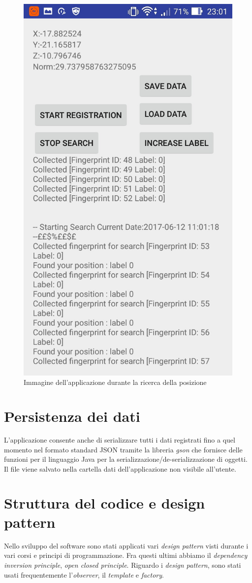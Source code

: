 \begin{figure}[H]
	\centering
	\includegraphics[width=0.7\linewidth]{img/app2}
	\caption{Immagine dell'applicazione durante la ricerca della posizione}
	\label{fig:app2}
\end{figure}


\section{Persistenza dei dati}
L'applicazione consente anche di serializzare tutti i dati registrati fino a quel momento nel formato standard JSON tramite la libreria \textit{gson} che fornisce delle funzioni  per il linguaggio Java per la serializzazione/de-serializzazione di oggetti. Il file viene salvato nella cartella dati dell'applicazione non visibile all'utente.

\section{Struttura del codice e design pattern}
Nello sviluppo del software sono stati applicati vari \textit{design pattern} visti durante i vari corsi e principi di programmazione. Fra questi ultimi abbiamo il \textit{dependency inversion principle}, \textit{open closed principle}. Riguardo i \textit{design pattern}, sono stati usati frequentemente l'\textit{observer}, il \textit{template} e \textit{factory}.

